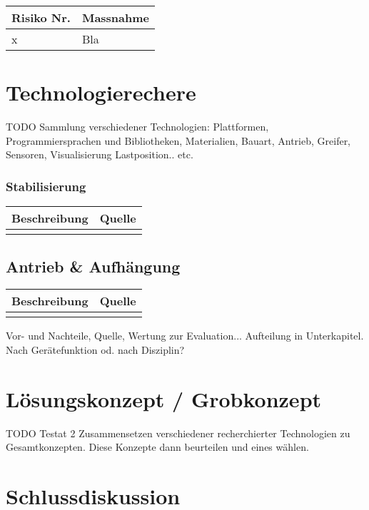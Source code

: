 \documentclass[a4paper]{report}
\begin{document}
\vspace{1em}
\noindent
\begin{tabular}{|l|l|}
	\hline 
	\textbf{Risiko Nr.} & \textbf{Massnahme} \\
	\hline
	x & Bla \\
	\hline
\end{tabular}

\chapter{Technologierechere}
TODO Sammlung verschiedener Technologien: Plattformen, Programmiersprachen und Bibliotheken, Materialien, Bauart, Antrieb, Greifer, Sensoren, Visualisierung Lastposition.. etc.

\subsection{Stabilisierung}

\vspace{1em}
\noindent
\begin{tabular}{|l|l|}
	\hline 
	\textbf{Beschreibung} & \textbf{Quelle} \\
	\hline
	 &  \\
	\hline
\end{tabular}

\section{Antrieb \& Aufhängung}

\vspace{1em}
\noindent
\begin{tabular}{|l|l|}
	\hline 
	\textbf{Beschreibung} & \textbf{Quelle} \\
	\hline
	&  \\
	\hline
\end{tabular}

Vor- und Nachteile, Quelle, Wertung zur Evaluation... 
Aufteilung in Unterkapitel. Nach Gerätefunktion od. nach Disziplin? 

\chapter{Lösungskonzept / Grobkonzept}
TODO Testat 2
Zusammensetzen verschiedener recherchierter Technologien zu Gesamtkonzepten. Diese Konzepte dann beurteilen und eines wählen. 

\chapter{Schlussdiskussion}
\end{document}
